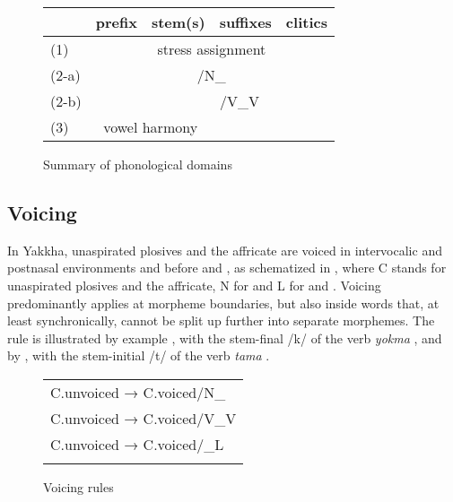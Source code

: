 

\begin{figure}[htp]
\begin{center}
\begin{tabular}{lllll} 
	&{\bf prefix}&{\bf stem(s)}&{\bf suffixes}&{\bf clitics}\\
\midrule
\cline{3-4}
(1)	&	&\multicolumn{2}{|c|}{stress assignment}&\\
\cline{2-5}
(2-a)&	\multicolumn{4}{|c|}{\isi{voicing}/N\_}\\
\cline{2-5}
(2-b)&	&\multicolumn{3}{|c|}{\isi{voicing}/V\_V}\\
\cline{2-5}
(3)&\multicolumn{2}{|c|}{vowel harmony}&&\\
\cline{2-3}
\end{tabular}
\caption{Summary of phonological domains}\label{w-domains}
\end{center}
\end{figure}


\subsection{Voicing}\label{voicing}

In Yakkha, unaspirated plosives and the affricate are voiced in intervocalic and postnasal environments and before  and , as schematized in , where C stands for unaspirated plosives and the affricate, N for  and L for  and . Voicing predominantly  applies at morpheme boundaries, but also inside words that, at least synchronically, cannot be split up further into separate morphemes. The rule is illustrated by example \Next, with the stem-final /k/ of the verb \emph{yokma} , and by \NNext, with the stem-initial /t/ of the verb \emph{tama} . 

\begin{figure}[htp]	
\begin{center}		
\begin{tabular}{l}
\lsptoprule
\midrule
C.{\sc unvoiced} → C.{\sc voiced}/N\_\\
C.{\sc unvoiced} → C.{\sc voiced}/V\_V\\ 
C.{\sc unvoiced} → C.{\sc voiced}/\_L\\
\lspbottomrule
\end{tabular}
\caption{Voicing rules}\label{voic-fig}
\end{center}
\end{figure}


